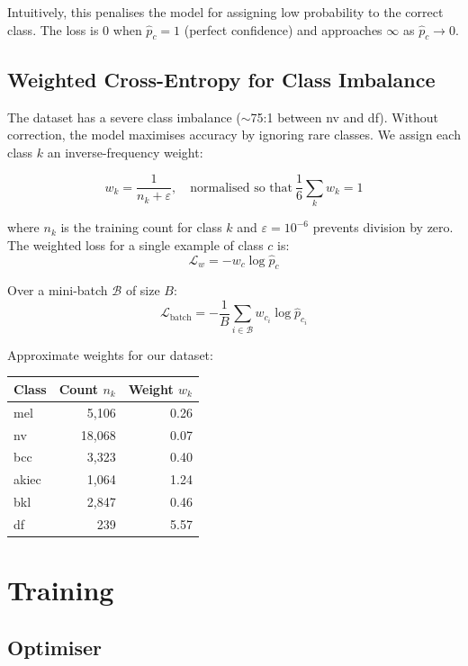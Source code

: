 \documentclass[12pt]{article}
\begin{document}
Intuitively, this penalises the model for assigning low probability to the
correct class. The loss is 0 when $\hat{p}_c = 1$ (perfect confidence) and
approaches $\infty$ as $\hat{p}_c \to 0$.

\subsection{Weighted Cross-Entropy for Class Imbalance}

The dataset has a severe class imbalance ($\sim$75:1 between nv and df).
Without correction, the model maximises accuracy by ignoring rare classes.
We assign each class $k$ an inverse-frequency weight:

\[
w_k = \frac{1}{n_k + \varepsilon}, \quad \text{normalised so that}\ \frac{1}{6}\sum_k w_k = 1
\]

where $n_k$ is the training count for class $k$ and $\varepsilon = 10^{-6}$
prevents division by zero. The weighted loss for a single example of class $c$ is:
\[
\mathcal{L}_w = -w_c \log \hat{p}_c
\]

Over a mini-batch $\mathcal{B}$ of size $B$:
\[
\mathcal{L}_{\text{batch}} = -\frac{1}{B} \sum_{i \in \mathcal{B}} w_{c_i} \log \hat{p}_{c_i}
\]

\medskip
\noindent Approximate weights for our dataset:

\begin{center}
\begin{tabular}{lrr}
\toprule
\textbf{Class} & \textbf{Count} $n_k$ & \textbf{Weight} $w_k$ \\
\midrule
mel   & 5{,}106  & 0.26 \\
nv    & 18{,}068 & 0.07 \\
bcc   & 3{,}323  & 0.40 \\
akiec & 1{,}064  & 1.24 \\
bkl   & 2{,}847  & 0.46 \\
df    &   239    & 5.57 \\
\bottomrule
\end{tabular}
\end{center}

\section{Training}

\subsection{Optimiser}
\end{document}
